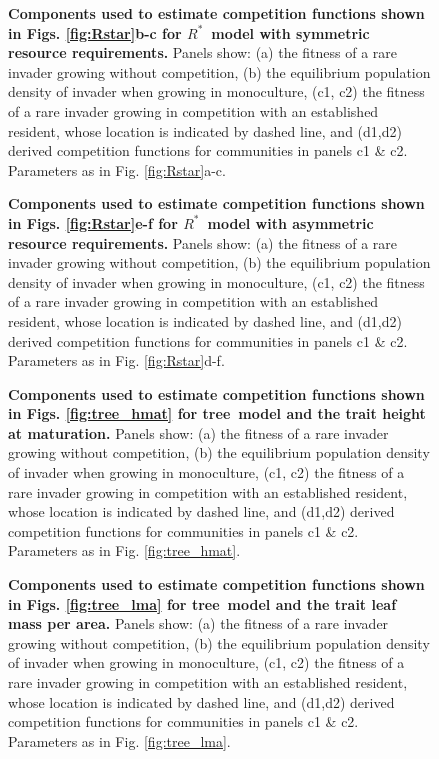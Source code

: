 \documentclass[a4paper,11pt]{article}
\newcommand{\Rstar}{\ensuremath{R^*}}
\newcommand{\TREE}{{\sc tree}}
\begin{document}
\begin{figure}[h]
 \centering
 \caption{\textbf{Components used to estimate competition functions shown in Figs.
 \ref{fig:Rstar}b-c for \Rstar\ model with symmetric resource requirements.}
  Panels show: (a) the fitness of a rare invader growing without competition,
  (b) the equilibrium population density of invader when growing in monoculture,
  (c1, c2) the fitness of a rare invader growing in competition with an established
  resident, whose location is indicated by dashed line, and (d1,d2) derived competition
  functions for communities in panels  c1 \& c2. Parameters as in Fig.
  \ref{fig:Rstar}a-c.
  \label{fig:sm_rstar_components1}}
\end{figure}

\begin{figure}[h]
 \centering
 \caption{\textbf{Components used to estimate competition functions shown in Figs.
 \ref{fig:Rstar}e-f for \Rstar\ model with asymmetric resource requirements.}
  Panels show: (a) the fitness of a rare invader growing without competition,
  (b) the equilibrium population density of invader when growing in monoculture,
  (c1, c2) the fitness of a rare invader growing in competition with an established
  resident, whose location is indicated by dashed line, and (d1,d2) derived competition
  functions for communities in panels c1 \& c2. Parameters as in Fig.
  \ref{fig:Rstar}d-f.
  \label{fig:sm_rstar_components2}}
\end{figure}

\begin{figure}[h]
 \centering
 \caption{\textbf{Components used to estimate competition functions shown in Figs.
 \ref{fig:tree_hmat} for \TREE\ model and the trait height at maturation.}
  Panels show: (a) the fitness of a rare invader growing without competition,
  (b) the equilibrium population density of invader when growing in monoculture,
  (c1, c2) the fitness of a rare invader growing in competition with an established
  resident, whose location is indicated by dashed line, and (d1,d2) derived competition
  functions for communities in panels c1 \& c2. Parameters as in Fig.
  \ref{fig:tree_hmat}.
  \label{fig:sm_tree_hmat_components}}
\end{figure}

\begin{figure}[h]
 \centering
 \caption{\textbf{Components used to estimate competition functions shown in Figs.
 \ref{fig:tree_lma} for \TREE\ model and the trait leaf mass per area.}
  Panels show: (a) the fitness of a rare invader growing without competition,
  (b) the equilibrium population density of invader when growing in monoculture,
  (c1, c2) the fitness of a rare invader growing in competition with an established
  resident, whose location is indicated by dashed line, and (d1,d2) derived competition
  functions for communities in panels  c1 \& c2. Parameters as in Fig.
  \ref{fig:tree_lma}.
  \label{fig:sm_tree_lma_components}}
\end{figure}
\end{document}
